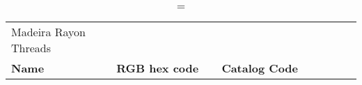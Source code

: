 
\begin{longtable}{p{0.3\linewidth} p{0.3\linewidth} p{0.4\linewidth}}
\caption = {Madeira Rayon Threads}
\label{tblr:madeirarayon}\\
\textbf{Name} & \textbf{RGB hex code} & \textbf{Catalog Code} \\

\end{longtable}

